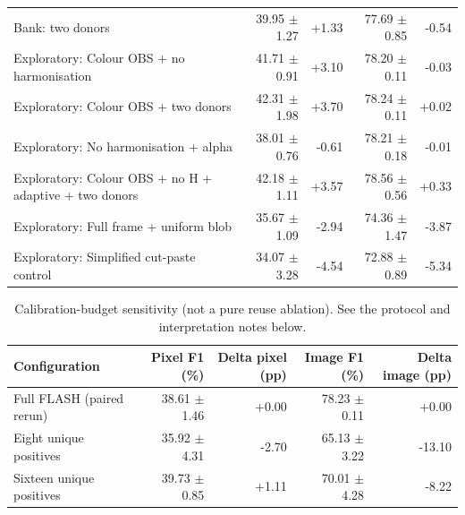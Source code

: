 \begin{table}[t]
\begin{tabular}{lrrrr}
Bank: two donors & 39.95 $\pm$ 1.27 & +1.33 & 77.69 $\pm$ 0.85 & -0.54 \\
Exploratory: Colour OBS + no harmonisation & 41.71 $\pm$ 0.91 & +3.10 & 78.20 $\pm$ 0.11 & -0.03 \\
Exploratory: Colour OBS + two donors & 42.31 $\pm$ 1.98 & +3.70 & 78.24 $\pm$ 0.11 & +0.02 \\
Exploratory: No harmonisation + alpha & 38.01 $\pm$ 0.76 & -0.61 & 78.21 $\pm$ 0.18 & -0.01 \\
Exploratory: Colour OBS + no H + adaptive + two donors & 42.18 $\pm$ 1.11 & +3.57 & 78.56 $\pm$ 0.56 & +0.33 \\
Exploratory: Full frame + uniform blob & 35.67 $\pm$ 1.09 & -2.94 & 74.36 $\pm$ 1.47 & -3.87 \\
Exploratory: Simplified cut-paste control & 34.07 $\pm$ 3.28 & -4.54 & 72.88 $\pm$ 0.89 & -5.34 \\
\hline
\end{tabular}
\end{table}

\begin{table}[t]
\centering
\scriptsize
\caption{Calibration-budget sensitivity (not a pure reuse ablation). See the protocol and interpretation notes below.}
\begin{tabular}{lrrrr}
\hline
Configuration & Pixel F1 (\%) & Delta pixel (pp) & Image F1 (\%) & Delta image (pp) \\
\hline
Full FLASH (paired rerun) & 38.61 $\pm$ 1.46 & +0.00 & 78.23 $\pm$ 0.11 & +0.00 \\
Eight unique positives & 35.92 $\pm$ 4.31 & -2.70 & 65.13 $\pm$ 3.22 & -13.10 \\
Sixteen unique positives & 39.73 $\pm$ 0.85 & +1.11 & 70.01 $\pm$ 4.28 & -8.22 \\
\hline
\end{tabular}
\end{table}

